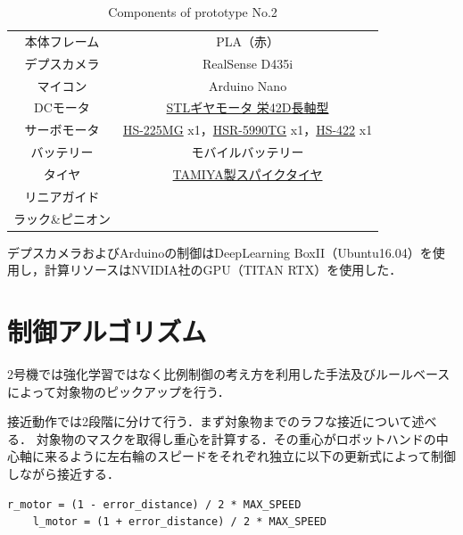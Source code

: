 \begin{table}[H]
    \centering
    \caption{Components of prototype No.2}
    \begin{tabular}{cc}\toprule
        本体フレーム & PLA（赤） \\
        デプスカメラ & RealSense D435i \\ 
        マイコン & Arduino Nano \\ 
        DCモータ & \href{http://akizukidenshi.com/catalog/g/gM-12379/}{STLギヤモータ 栄42D長軸型} \\ 
        サーボモータ & \href{https://hitecrcd.co.jp/products/servo32225/}{HS-225MG} x1，\href{https://hitecrcd.com/products/servos/discontinued-servos-servo-accessories/hsr-5990tg-hmi-ultra-premium-robot-servo/product}{HSR-5990TG} x1，\href{https://hitecrcd.co.jp/products/servo31422s/}{HS-422} x1 \\ 
        バッテリー & モバイルバッテリー \\ 
        タイヤ & \href{https://tamiya.com/japan/products/70194/index.html}{TAMIYA製スパイクタイヤ} \\
        リニアガイド &  \\
        ラック\&ピニオン &  \\ \bottomrule
    \end{tabular} 
    \label{tab:2号機部品}
\end{table}

デプスカメラおよびArduinoの制御はDeepLearning BoxII（Ubuntu16.04）を使用し，計算リソースはNVIDIA社のGPU（TITAN RTX）を使用した．



\section{制御アルゴリズム}
2号機では強化学習ではなく比例制御の考え方を利用した手法及びルールベースによって対象物のピックアップを行う．

接近動作では2段階に分けて行う．まず対象物までのラフな接近について述べる．
対象物のマスクを取得し重心を計算する．その重心がロボットハンドの中心軸に来るように左右輪のスピードをそれぞれ独立に以下の更新式によって制御しながら接近する．

\begin{lstlisting}[caption=接近アルゴリズム, label=code:motor]
    r_motor = (1 - error_distance) / 2 * MAX_SPEED
    l_motor = (1 + error_distance) / 2 * MAX_SPEED
\end{lstlisting}


